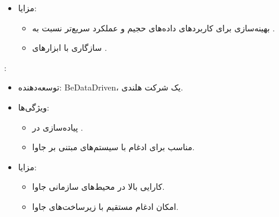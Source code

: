 \documentclass[11pt, a4paper, oneside]{book}
\newcounter{itemadded}
\let\LaTeXStandardEnumerateBegin\enumerate
\let\LaTeXStandardEnumerateEnd\endenumerate
\renewenvironment{enumerate}{%
	\LaTeXStandardEnumerateBegin%
	\setcounter{itemadded}{0}
}{%
	\LaTeXStandardEnumerateEnd%
}%
\begin{document}
\begin{enumerate}
\begin{itemize}
\begin{itemize}
						\item یک پیاده‌سازی جایگزین برای  با هدف افزایش سرعت اجرا.
						
						\item از JIT برای اجرای سریع‌تر کدها بهره می‌برد.
						
					\end{itemize}
					
					\item {\large مزایا}:
					
					\begin{itemize}
						
						\item بهینه‌سازی برای کاربردهای داده‌های حجیم و عملکرد سریع‌تر نسبت به .
						
						\item سازگاری با ابزارهای .
						
					\end{itemize}
					
				\end{itemize}
				
				
				\item {\large {}}:
				
				\begin{itemize}
					
					\item  {\large توسعه‌دهنده}:
					{\normalsize BeDataDriven، یک شرکت هلندی.}
					
					\item {\large ویژگی‌ها}:
					
					\begin{itemize}
						
						\item پیاده‌سازی  در .
						
						\item مناسب برای ادغام با سیستم‌های مبتنی بر جاوا.
						
					\end{itemize}
					
					\item {\large مزایا}:
					
					\begin{itemize}
						
						\item کارایی بالا در محیط‌های سازمانی جاوا.
						
						\item امکان ادغام مستقیم با زیرساخت‌های جاوا.
						

\end{itemize}
\end{itemize}
\end{enumerate}
\end{document}
